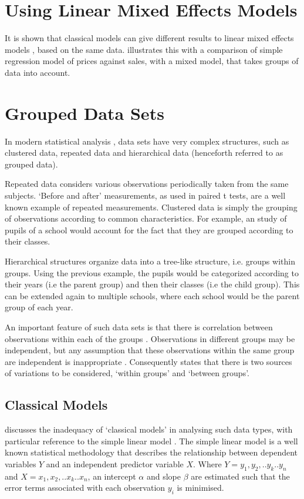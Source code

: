 \documentclass[12pt, a4paper]{report}
\theoremstyle{plain}
\theoremstyle{definition}
\theoremstyle{remark}
\begin{document}
\section{Using Linear Mixed Effects Models} It is shown that
classical models can give different results to linear mixed
effects models , based on the same data. \citet{Demi} illustrates
this with a comparison of simple regression model of prices
against sales, with a mixed model, that takes groups of data into
account.
\section{Grouped Data Sets}
In modern statistical analysis , data sets have very complex
structures, such as  clustered data, repeated data and
hierarchical data (henceforth referred to as grouped data).

Repeated data considers various observations periodically taken
from the same subjects. `Before and after' measurements, as used
in paired t tests, are a well known example of repeated
measurements. Clustered data is simply the grouping of
observations according to common characteristics. For example, an
study of pupils of a school would account for the fact that they
are grouped according to their classes.

Hierarchical structures organize data into a tree-like structure,
i.e. groups within groups. Using the previous example, the pupils
would be categorized according to their years (i.e the parent
group) and then their classes (i.e the child group). This can be
extended again to multiple schools, where each school would be the
parent group of each year.

An important feature of such data sets is that there is
correlation between observations within each of the groups
\citep{Faraway}. Observations in different groups may be
independent, but any assumption that these observations within the
same group are independent is inappropriate . Consequently
\citet{Demi} states that there is two sources of variations to be
considered, `within groups' and `between groups'.


\subsection{Classical Models}
\citet{Demi} discusses the inadequacy of `classical models' in
analysing such data types, with particular reference to the simple
linear model . The simple linear model is a well known statistical
methodology that describes the relationship between dependent
variables $Y$ and an independent predictor variable $X$. Where
$Y={y_{1},y_{2},..y_{k}..y_{n}}$ and
$X={x_{1},x_{2},..x_{k}..x_{n}}$, an intercept $\alpha$ and slope
$\beta$ are estimated such that the error terms associated with
each observation $y_{i}$ is minimised.
\end{document}

